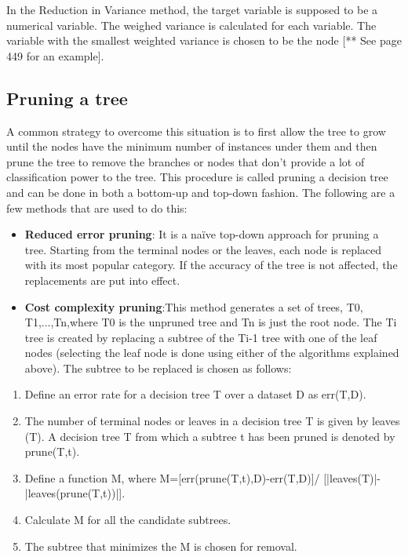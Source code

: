 \documentclass{article}
\numberwithin{equation}{section} %
\begin{document}
In the Reduction in Variance method, the target variable is supposed to be a
numerical variable. The weighed variance is calculated for each variable. The variable with the smallest weighted variance is chosen to be the node [** See page 449 for an example]. 

\subsection*{Pruning a tree}

A common strategy to overcome this situation is to first allow the tree to grow until the nodes have the minimum number of instances under them and then prune the
tree to remove the branches or nodes that don't provide a lot of classification power to the tree. This procedure is called pruning a decision tree and can be done in both a bottom-up and top-down fashion. The following are a few methods that are used to do this: 

\begin{itemize}
	\item \textbf{Reduced error pruning}: It is a naïve top-down approach for pruning a tree. Starting from the terminal nodes or the leaves, each node is replaced with its most popular category. If the accuracy of the tree is not affected, the replacements are put into effect.
	\item \textbf{Cost complexity pruning}:This method generates a set of trees, T0, T1,...,Tn,where T0 is the unpruned tree and Tn is just the root node. The Ti tree is created by replacing a subtree of the Ti-1 tree with one of the leaf nodes (selecting the leaf node is done using either of the algorithms explained
	above). The subtree to be replaced is chosen as follows: 
	
\end{itemize}

\begin{enumerate}
	\item Define an error rate for a decision tree T over a dataset D as err(T,D).
	\item The number of terminal nodes or leaves in a decision tree T is given
	by leaves (T). A decision tree T from which a subtree t has been
	pruned is denoted by prune(T,t).
	\item Define a function M, where M=[err(prune(T,t),D)-err(T,D)]/
	[|leaves(T)|-|leaves(prune(T,t))|].
	\item Calculate M for all the candidate subtrees.
	\item The subtree that minimizes the M is chosen for removal.
\end{enumerate}
\end{document}
